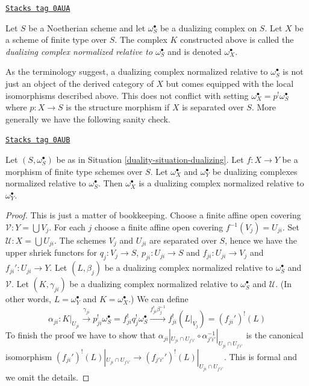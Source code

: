 \begin{definition}
\label{duality-definition-good-dualizing}
\href{https://stacks.math.columbia.edu/tag/0AUA}{\texttt{Stacks tag 0AUA}}

Let $S$ be a Noetherian scheme and let $\omega_S^\bullet$ be a dualizing
complex on $S$. Let $X$ be a scheme of finite type over $S$.
The complex $K$ constructed above is called the
{\it dualizing complex normalized relative to $\omega_S^\bullet$}
and is denoted $\omega_X^\bullet$.
\end{definition}

As the terminology suggest, a dualizing complex normalized relative to
$\omega_S^\bullet$ is not just an object of the derived category of $X$
but comes equipped with the local isomorphisms described above.
This does not conflict with setting
$\omega_X^\bullet = p^!\omega_S^\bullet$ where $p : X \to S$ is the
structure morphism if $X$ is separated over $S$. More generally
we have the following sanity check.

\begin{lemma}
\label{duality-lemma-good-over-both}
\href{https://stacks.math.columbia.edu/tag/0AUB}{\texttt{Stacks tag 0AUB}}

Let $(S, \omega_S^\bullet)$ be as in Situation \ref{duality-situation-dualizing}.
Let $f : X \to Y$ be a morphism of finite type schemes over $S$.
Let $\omega_X^\bullet$ and $\omega_Y^\bullet$ be dualizing complexes
normalized relative to $\omega_S^\bullet$. Then $\omega_X^\bullet$
is a dualizing complex normalized relative to $\omega_Y^\bullet$.
\end{lemma}

\begin{proof}
This is just a matter of bookkeeping.
Choose a finite affine open covering $\mathcal{V} : Y = \bigcup V_j$.
For each $j$ choose a finite affine open covering $f^{-1}(V_j) = U_{ji}$.
Set $\mathcal{U} : X = \bigcup U_{ji}$. The schemes $V_j$ and $U_{ji}$ are
separated over $S$, hence we have the upper shriek functors for
$q_j : V_j \to S$, $p_{ji} : U_{ji} \to S$ and
$f_{ji} : U_{ji} \to V_j$ and $f_{ji}' : U_{ji} \to Y$.
Let $(L, \beta_j)$ be a dualizing complex normalized relative to
$\omega_S^\bullet$ and $\mathcal{V}$.
Let $(K, \gamma_{ji})$ be a dualizing complex normalized relative to
$\omega_S^\bullet$ and $\mathcal{U}$.
(In other words, $L = \omega_Y^\bullet$ and $K = \omega_X^\bullet$.)
We can define
$$
\alpha_{ji} :
K|_{U_{ji}} \xrightarrow{\gamma_{ji}}
p_{ji}^!\omega_S^\bullet = f_{ji}^!q_j^!\omega_S^\bullet
\xrightarrow{f_{ji}^!\beta_j^{-1}} f_{ji}^!(L|_{V_j}) =
(f_{ji}')^!(L)
$$
To finish the proof we have to show that
$\alpha_{ji}|_{U_{ji} \cap U_{j'i'}}
\circ \alpha_{j'i'}^{-1}|_{U_{ji} \cap U_{j'i'}}$
is the canonical isomorphism
$(f_{ji}')^!(L)|_{U_{ji} \cap U_{j'i'}} \to
(f_{j'i'}')^!(L)|_{U_{ji} \cap U_{j'i'}}$. This is formal and we
omit the details.
\end{proof}


